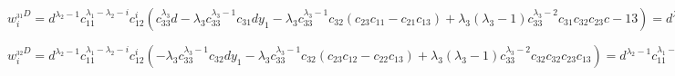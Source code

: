 %
%
$ w_i^{_{31}D} = d^{\lambda_2 - 1} c_{11}^{\lambda_1 - \lambda_2 - i} c_{12}^i (c_{33}^{\lambda_3} d - \lambda_3 c_{33}^{\lambda_3 - 1} c_{31} d y_1 - \lambda_3 c_{33}^{\lambda_3 - 1} c_{32} (c_{23}c_{11} - c_{21}c_{13}) + \lambda_3 (\lambda_3 - 1) c_{33}^{\lambda_3 - 2} c_{31}c_{32}c_{23}c-{13}) = d^{\lambda_2 - 1} c_{11}^{\lambda_1 - \lambda_2 - i} c_{12}^i (c_{33}^{\lambda_3} d - \lambda_3 c_{33}^{\lambda_3 - 1} (c_{31} d y_1 + c_{32} d y_2) + \lambda_3 (\lambda_3 - 1) c_{33}^{\lambda_3 - 2} c_{31}c_{13}c_{32}c_{23}) = ~v_i $
\newline

%
%
$ w_i^{_{32}D} = d^{\lambda_2 - 1} c_{11}^{\lambda_1 - \lambda_2 - i} c_{12}^i (- \lambda_3 c_{33}^{\lambda_3 - 1} c_{32} d y_1 - \lambda_3 c_{33}^{\lambda_3 - 1} c_{32} (c_{23}c_{12} - c_{22}c_{13}) + \lambda_3 (\lambda_3 - 1) c_{33}^{\lambda_3 - 2} c_{32}c_{32}c_{23}c_{13}) = d^{\lambda_2 - 1} c_{11}^{\lambda_1 - \lambda_2 - i} c_{12}^i (- \lambda_3 c_{33}^{\lambda_3 - 1} c_{32} d y_1 - \lambda_3 c_{33}^{\lambda_3 - 1} c_{32} (- d y_1)) = ~0 $